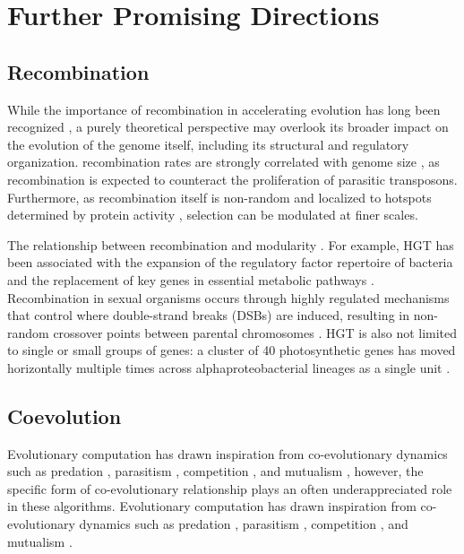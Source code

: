 \section{Further Promising Directions}

\subsection{Recombination}

While the importance of recombination in accelerating evolution has long been recognized \citep{felsenstein1976evolutionary}, a purely theoretical perspective may overlook its broader impact on the evolution of the genome itself, including its structural and regulatory organization.
recombination rates are strongly correlated with genome size \citep{tiley2015relationship}, as recombination is expected to counteract the proliferation of parasitic transposons.
Furthermore, as recombination itself is non-random and localized to hotspots determined by protein activity \citep{paul2016recombination}, selection can be modulated at finer scales.

The relationship between recombination and modularity \cite{wiser2019horizontal,kreimer2008evolution}.
For example, HGT has been associated with the expansion of the regulatory factor repertoire of bacteria \cite{price2008horizontal} and the replacement of key genes in essential metabolic pathways \cite{goyal2022horizontal}.
Recombination in sexual organisms occurs through highly regulated mechanisms that control where double-strand breaks (DSBs) are induced, resulting in non-random crossover points between parental chromosomes \cite{stapley2017recombination}.
HGT is also not limited to single or small groups of genes: a cluster of 40 photosynthetic genes has moved horizontally multiple times across alphaproteobacterial lineages as a single unit \cite{martin2018physiological, brinkmann2018horizontal}.

\subsection{Coevolution}

Evolutionary computation has drawn inspiration from co-evolutionary dynamics such as predation \citep{willkens2022evolving,popovici2012coevolutionary, ficici2000gametheoretic}, parasitism \citep{hillis1990coevolving,  cliff1995tracking}, competition \citep{stanley2004competitive}, and mutualism \citep{wang2019paired, bucci2005identifying, bucci2003mathematical, bucci2003focusing, watson2003computational, watson2001coevolutionary}, however, the specific form of co-evolutionary relationship plays an often underappreciated role in these algorithms.
Evolutionary computation has drawn inspiration from co-evolutionary dynamics such as predation \citep{willkens2022evolving,popovici2012coevolutionary, ficici2000gametheoretic}, parasitism \citep{hillis1990coevolving,  cliff1995tracking}, competition \citep{stanley2004competitive}, and mutualism \citep{wang2019paired, bucci2005identifying, bucci2003mathematical, bucci2003focusing, watson2003computational, watson2001coevolutionary}.

